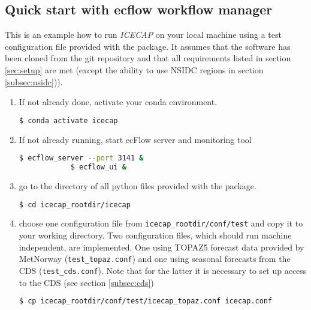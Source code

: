 \documentclass[DIV=10, parskip=full]{scrreprt}
\newcommand{\ice}{\textit{ICECAP}\xspace}
\begin{document}
\subsection{Quick start with ecflow workflow manager} \label{sec:quick_start}
This is an example how to run \ice on your local machine using a test configuration file provided with the package. It assumes that the software has been cloned from the git repository and that all requirements listed in section \ref{sec:setup} are met (except the ability to use NSIDC regions in section \ref{subsec:nsidc})).

\begin{enumerate}
	\item If not already done, activate your conda environment.
	\begin{lstlisting}[language=bash]
		$ conda activate icecap 
	\end{lstlisting}
	
	\item If not already running, start ecFlow server and monitoring tool 
		\begin{lstlisting}[language=bash]
			$ ecflow_server --port 3141 &
			$ ecflow_ui & 
		\end{lstlisting}

		
	\item go to the directory of all python files provided with the package.
	\begin{lstlisting}[language=bash]
		$ cd icecap_rootdir/icecap
	\end{lstlisting}
	
	\item choose one configuration file from \texttt{icecap\_rootdir/conf/test} and copy it to your working directory. Two configuration files, which should run machine independent, are implemented. One using TOPAZ5 forecast data provided by MetNorway (\texttt{test\_topaz.conf}) and one using seasonal forecasts from the CDS (\texttt{test\_cds.conf}). Note that for the latter it is necessary to set up access to the CDS (see section \ref{subsec:cds})\\
	\begin{lstlisting}[language=bash]
		$ cp icecap_rootdir/conf/test/icecap_topaz.conf icecap.conf
	\end{lstlisting}
	

\end{enumerate}
\end{document}

